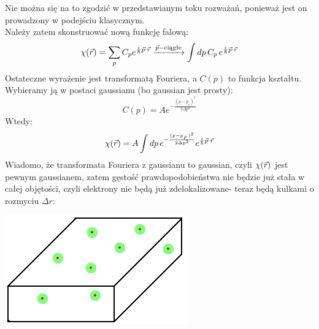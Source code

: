 Nie można się na to zgodzić w przedstawianym toku rozważań, ponieważ jest on prowadzony w podejściu klasycznym.\\
Należy zatem skonstruować nową funkcję falową:
\begin{equation}\chi(\vec{r})=\sum_p C_pe^{\frac{i}{\hbar}\vec{p}\cdot\vec{r}} \xrightarrow{\vec{p}-\text{ciągłe}}\int dp \,C_p\,e^{\frac{i}{\hbar}\vec{p}\cdot\vec{r}}
\end{equation}
Ostateczne wyrażenie jest transformatą Fouriera, a $C(p)$ to funkcja kształtu. Wybieramy ją w postaci gaussianu (bo gaussian jest prosty):
\begin{equation}C(p)=Ae^{-\frac{(p-p_{_F})^2}{2\Delta p^2}}
\end{equation}
Wtedy:
\begin{equation}\chi(\vec{r})=A\int dp\,e^{-\frac{(p-p_{_F})^2}{2\Delta p^2}}e^{\frac{i}{\hbar}{\vec{p}\cdot\vec{r}}}
\end{equation}
Wiadomo, że transformata Fouriera z gaussianu to gaussian, czyli $\chi(\vec{r})$ jest pewnym gaussianem, zatem gęstość prawdopodobieństwa nie będzie już stała w całej objętości, czyli elektrony nie będą już zdelokalizowane- teraz będą kulkami o rozmyciu $\Delta r$:\\
\begin{center}\includegraphics[scale=0.7]{obrazki/wykl_8_obrazek1.png}\end{center}
